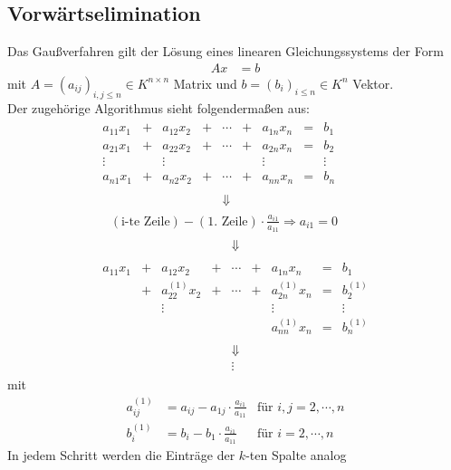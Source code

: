 \documentclass[ngerman,fontsize=11pt, paper=a4, parskip=half, titlepage=true, toc=bib]{scrbook}
\theoremstyle{definition}
\theoremstyle{plain}
\newcommand{\subsectione}[1]{\subsection{#1} \addtocounter{Def}{1}}
\begin{document}
\subsectione{Vorwärtselimination} \label{2.1.1}
Das Gaußverfahren gilt der Lösung eines linearen Gleichungssystems der Form
\begin{align*}
  Ax &= b
\end{align*}
mit $A=(a_{ij})_{i,j \leq n} \in K^{n\times n}$ Matrix und $b=(b_i)_{i\leq n} \in K^n$ Vektor.\\
Der zugehörige Algorithmus sieht folgendermaßen aus:
\begin{gather*}
  \begin{array}{ccccccccc}
    a_{11}x_1 &+& a_{12}x_2 &+& \cdots &+& a_{1n}x_n & = & b_1 ~~\\
    a_{21}x_1 &+& a_{22}x_2 &+& \cdots &+& a_{2n}x_n & = & b_2 \\
    \vdots         &&        \vdots     &&              &&   \vdots       &    & \vdots \\
    a_{n1}x_1 &+& a_{n2}x_2 &+& \cdots &+& a_{nn}x_n & = & b_n \\\\
              &&&& \Downarrow &&&& 
  \end{array} \\
  \quad	(\text{i-te Zeile}) - (\text{1. Zeile})\cdot \frac{a_{i1}}{a_{11}} \Rightarrow a_{i1}=0\\
  \begin{array}{ccccccccc}
    &&&& \Downarrow &&&&  \\\\
    a_{11}x_1 &+& a_{12}x_2 &+& \cdots &+& a_{1n}x_n & = & b_1 \\
    &+& a_{22}^{(1)}x_2 &+& \cdots &+& a_{2n}^{(1)}x_n & = & b_2^{(1)} \\
    &&        \vdots     &&              &&   \vdots       &    & \vdots \\
    && && && a_{nn}^{(1)}x_n & = & b_n^{(1)} \\\\
    &&&& \Downarrow &&&&\\
    &&&& \vdots &&&&
  \end{array} 
\end{gather*}
mit
\begin{align*}
  a_{ij}^{(1)} &= a_{ij}-a_{1j}\cdot \frac{a_{i1}}{a_{11}}
  & \text{für }i,j = 2, \cdots, n \\
  b_i^{(1)}      &= b_i- b_1\cdot \frac{a_{i1}}{a_{11}}
  & \text{für }i = 2, \cdots, n 
\end{align*}
In jedem Schritt werden die Einträge der $k$-ten Spalte analog 
\end{document}
